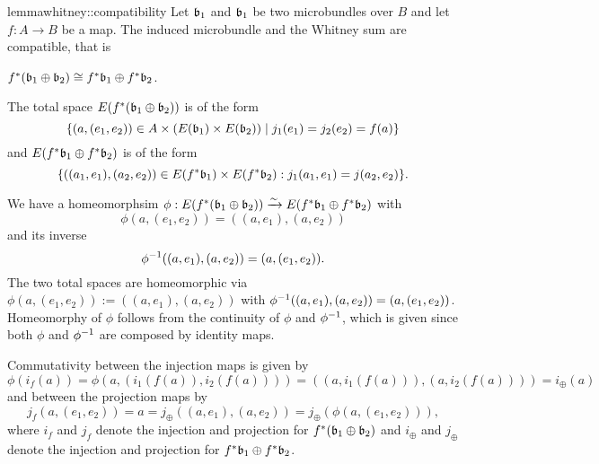 \begin{scope}
    \newcommand{\wleft} {%
        \ind{f} (\whitney{\bb_1}{\bb_2})%
    }
    \newcommand{\wright} {%
        \whitney{\ind{f}\bb_1}{\ind{f}\bb_2}%
    }

    \begin{mystatement}{lemma}{whitney::compatibility}
        Let $\bb_1$ and $\bb_1$ be two microbundles over $B$ and let $f: A \to B$ be a map.
        The induced microbundle and the Whitney sum are compatible, that is
        \begin{center}
            $\wleft \cong \wright$.
        \end{center}
    \end{mystatement}

    \begin{myproof}
        The total space $E(\wleft)$ is of the form
        \[ \{(a, (e_1, e_2)) \in A \cross (E(\bb_1) \cross E(\bb_2)) \mid j_1(e_1) = j_2(e_2) = f(a) \} \]
        and $E(\wright)$ is of the form
        \[ \set{((a_1, e_1), (a_2, e_2)) \in E(\ind{f}\bb_1) \cross E(\ind{f}\bb_2)}{j_1(a_1, e_1) = j(a_2, e_2)}. \]

        We have a homeomorphsim $\phi: E(\wleft) \isomto E(\wright)$ with
        \[ \phi(a, (e_1, e_2)) = ((a, e_1), (a, e_2)) \]
        and its inverse
        \[ \phi^{-1}((a, e_1), (a, e_2)) = (a, (e_1, e_2)). \]
        The two total spaces are homeomorphic via
        $\phi(a, (e_1, e_2)) := ((a, e_1), (a, e_2))$ with $\phi^{-1}((a, e_1), (a, e_2)) = (a, (e_1, e_2))$.
        Homeomorphy of $\phi$ follows from the continuity of $\phi$ and $\phi^{-1}$,
        which is given since both $\phi$ and $\phi^{-1}$ are composed by identity maps.
        
        Commutativity between the injection maps is given by
        \[ \phi(i_f(a)) = \phi(a, (i_1(f(a)), i_2(f(a)))) = ((a, i_1(f(a))), (a, i_2(f(a)))) = i_\oplus(a) \]
        and between the projection maps by
        \[ j_f(a, (e_1, e_2)) = a = j_\oplus((a, e_1), (a, e_2)) = j_\oplus(\phi(a, (e_1, e_2))), \]
        where $i_f$ and $j_f$ denote the injection and projection for $\wleft$
        and $i_\oplus$ and $j_\oplus$ denote the injection and projection for $\wright$.
    \end{myproof}
\end{scope}